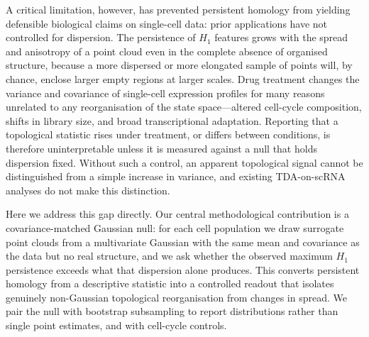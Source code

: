 A critical limitation, however, has prevented persistent homology
from yielding defensible biological claims on single-cell data: prior
applications have not controlled for dispersion. The persistence of
$H_1$ features grows with the spread and anisotropy of a point cloud
even in the complete absence of organised structure, because a more
dispersed or more elongated sample of points will, by chance, enclose
larger empty regions at larger scales. Drug treatment changes the
variance and covariance of single-cell expression profiles for many
reasons unrelated to any reorganisation of the state space---altered
cell-cycle composition, shifts in library size, and broad
transcriptional adaptation. Reporting that a topological statistic
rises under treatment, or differs between conditions, is therefore
uninterpretable unless it is measured against a null that holds
dispersion fixed. Without such a control, an apparent topological
signal cannot be distinguished from a simple increase in variance,
and existing TDA-on-scRNA analyses do not make this distinction.

Here we address this gap directly. Our central methodological
contribution is a covariance-matched Gaussian null: for each cell
population we draw surrogate point clouds from a multivariate Gaussian
with the same mean and covariance as the data but no real structure,
and we ask whether the observed maximum $H_1$ persistence exceeds what
that dispersion alone produces. This converts persistent homology from
a descriptive statistic into a controlled readout that isolates
genuinely non-Gaussian topological reorganisation from changes in
spread. We pair the null with bootstrap subsampling to report
distributions rather than single point estimates, and with
cell-cycle controls.

